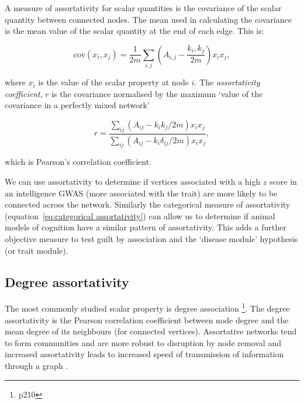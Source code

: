 A measure of assortativity for scalar quantities is the covariance of the scalar quantity between connected nodes. The mean used in calculating the covariance is the mean value of the scalar quantity at the end of each edge. This is:

\begin{equation}
   \textrm{cov}(x_i,x_j)  = \frac{1}{2m}\sum_{i,j}(A_{i,j}-\frac{k_i,k_j}{2m})x_ix_j,
   \label{eq:assortativity covariance of xi and xj over edges}
\end{equation}

where $x_i$ is the value of the scalar property at node $i$. The \textit{assortativity coefficient}, $r$ is the covariance normalised by the maximum `value of the covariance in a perfectly mixed network'\cite{newman2018networks}

 \begin{equation}
     r = \frac{\sum_{ij}(A_{ij}-k_ik_j/2m)x_ix_j}{\sum_{ij}(A_{ij}-k_i\delta_{ij}/2m)x_ix_j},
 \end{equation}
 
 which is Pearson's correlation coefficient\cite{newman2018networks}.
 
We can use assortativity to determine if vertices associated with a high $z$ score in an intelligence GWAS (more associated with the trait) are more likely to be connected across the network. Similarly the categorical measure of assortativity (equation~\ref{eq:categorical assortativity}) can allow us to determine if animal models of cognition have a similar pattern of assortativity. This adds a further objective measure to test guilt by association and the `disease module'\cite{baranzini2013network} hypothesis (or trait module).

\subsection{Degree assortativity}
\label{sec:degree assortativity}

The most commonly studied scalar property is degree association \cite{newman2018networks}\footnote{p210}. The degree assortativity is the Pearson correlation coefficient between node degree and the mean degree of its neighbours (for connected vertices)\cite{noldus2015assortativity}. Assortative networks tend to form communities and are more robust to disruption by node removal \cite{newman2002assortative} and increased assortativity leads to increased speed of transmission of information through a graph \cite{noldus2015assortativity}.


